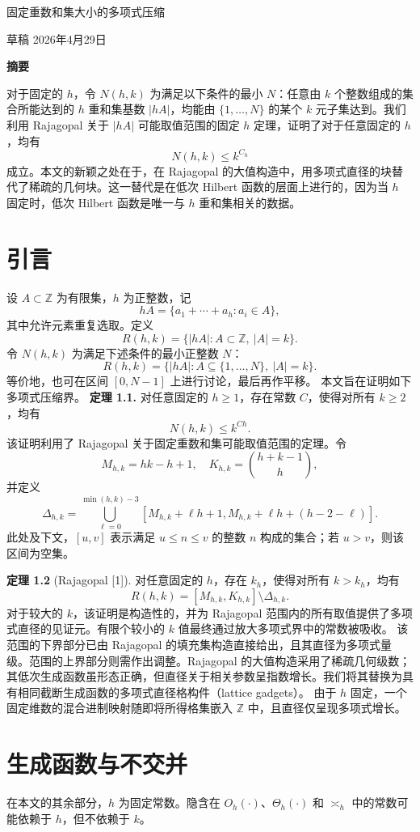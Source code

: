 \documentclass[11pt]{article}
\theoremstyle{break}
\begin{document}
固定重数和集大小的多项式压缩

草稿 \quad 2026年4月29日

\textbf{摘要}

对于固定的 $h$，令 $N(h,k)$ 为满足以下条件的最小 $N$：任意由 $k$ 个整数组成的集合所能达到的 $h$ 重和集基数 $|hA|$，均能由 $\{1,\dots,N\}$ 的某个 $k$ 元子集达到。我们利用 Rajagopal 关于 $|hA|$ 可能取值范围的固定 $h$ 定理，证明了对于任意固定的 $h$，均有
\[ N(h,k) \le k^{C_h} \]
成立。本文的新颖之处在于，在 Rajagopal 的大值构造中，用多项式直径的块替代了稀疏的几何块。这一替代是在低次 Hilbert 函数的层面上进行的，因为当 $h$ 固定时，低次 Hilbert 函数是唯一与 $h$ 重和集相关的数据。
\section{引言}
设 $A \subset \mathbb{Z}$ 为有限集，$h$ 为正整数，记
\[ hA = \{a_1 + \cdots + a_h : a_i \in A\}, \]
其中允许元素重复选取。定义
\[ R(h,k) = \{|hA| : A \subset \mathbb{Z},\ |A| = k\}. \]
令 $N(h,k)$ 为满足下述条件的最小正整数 $N$：
\[ R(h,k) = \{|hA| : A \subseteq \{1,\dots,N\},\ |A| = k\}. \]
等价地，也可在区间 $[0, N-1]$ 上进行讨论，最后再作平移。
本文旨在证明如下多项式压缩界。
\textbf{定理 1.1.}
对任意固定的 $h \geq 1$，存在常数 $C$，使得对所有 $k \geq 2$，均有
\[ N(h,k) \leq k^{Ch}. \]
该证明利用了 Rajagopal 关于固定重数和集可能取值范围的定理。令
\[ M_{h,k} = hk - h + 1, \quad K_{h,k} = \binom{h+k-1}{h}, \]
并定义
\[ \Delta_{h,k} = \bigcup_{\ell=0}^{\min(h,k)-3} [M_{h,k} + \ell h + 1, M_{h,k} + \ell h + (h-2-\ell)]. \]
此处及下文，$[u,v]$ 表示满足 $u \leq n \leq v$ 的整数 $n$ 构成的集合；若 $u > v$，则该区间为空集。

\textbf{定理 1.2} (Rajagopal [1]). 对任意固定的 $h$，存在 $k_h$，使得对所有 $k > k_h$，均有
\[ R(h,k) = [M_{h,k}, K_{h,k}] \setminus \Delta_{h,k}. \]
对于较大的 $k$，该证明是构造性的，并为 Rajagopal 范围内的所有取值提供了多项式直径的见证元。有限个较小的 $k$ 值最终通过放大多项式界中的常数被吸收。
该范围的下界部分已由 Rajagopal 的填充集构造直接给出，且其直径为多项式量级。范围的上界部分则需作出调整。Rajagopal 的大值构造采用了稀疏几何级数；其低次生成函数虽形态正确，但直径关于相关参数呈指数增长。我们将其替换为具有相同截断生成函数的多项式直径格构件（lattice gadgets）。
由于 $h$ 固定，一个固定维数的混合进制映射随即将所得格集嵌入 $\mathbb{Z}$ 中，且直径仅呈现多项式增长。
\section{生成函数与不交并}
在本文的其余部分，$h$ 为固定常数。隐含在 $O_h(\cdot)$、$\Theta_h(\cdot)$ 和 $\asymp_h$ 中的常数可能依赖于 $h$，但不依赖于 $k$。
\end{document}
